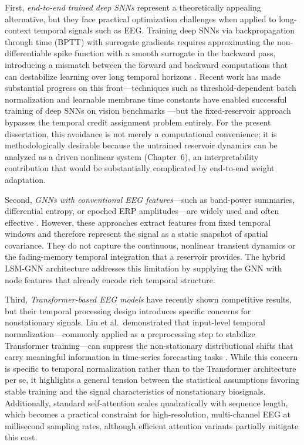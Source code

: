 First, \emph{end-to-end trained deep SNNs} represent a theoretically appealing alternative, but they face practical optimization challenges when applied to long-context temporal signals such as EEG. Training deep SNNs via backpropagation through time (BPTT) with surrogate gradients requires approximating the non-differentiable spike function with a smooth surrogate in the backward pass, introducing a mismatch between the forward and backward computations that can destabilize learning over long temporal horizons \cite{neftci_surrogate_2019}. Recent work has made substantial progress on this front---techniques such as threshold-dependent batch normalization and learnable membrane time constants have enabled successful training of deep SNNs on vision benchmarks \cite{zheng_tdbn_2021, fang_plif_2021}---but the fixed-reservoir approach bypasses the temporal credit assignment problem entirely. For the present dissertation, this avoidance is not merely a computational convenience; it is methodologically desirable because the untrained reservoir dynamics can be analyzed as a driven nonlinear system (Chapter~6), an interpretability contribution that would be substantially complicated by end-to-end weight adaptation.

Second, \emph{GNNs with conventional EEG features}---such as band-power summaries, differential entropy, or epoched ERP amplitudes---are widely used and often effective \cite{Jia2024GNNEEGSentiment}. However, these approaches extract features from fixed temporal windows and therefore represent the signal as a static snapshot of spatial covariance. They do not capture the continuous, nonlinear transient dynamics or the fading-memory temporal integration that a reservoir provides. The hybrid LSM-GNN architecture addresses this limitation by supplying the GNN with node features that already encode rich temporal structure.

Third, \emph{Transformer-based EEG models} have recently shown competitive results, but their temporal processing design introduces specific concerns for nonstationary signals. Liu et al.\ demonstrated that input-level temporal normalization---commonly applied as a preprocessing step to stabilize Transformer training---can suppress the non-stationary distributional shifts that carry meaningful information in time-series forecasting tasks \cite{liu_nonstationary_2022}. While this concern is specific to temporal normalization rather than to the Transformer architecture per se, it highlights a general tension between the statistical assumptions favoring stable training and the signal characteristics of nonstationary biosignals. Additionally, standard self-attention scales quadratically with sequence length, which becomes a practical constraint for high-resolution, multi-channel EEG at millisecond sampling rates, although efficient attention variants partially mitigate this cost.


